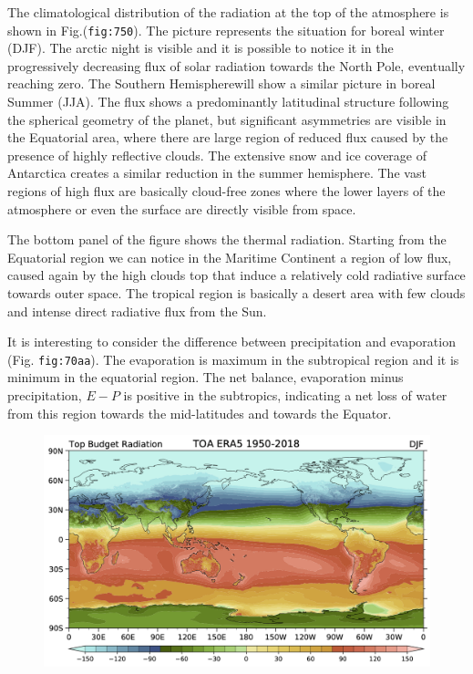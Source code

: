 
The climatological distribution of the radiation at the top of the
atmosphere is shown in Fig.(\texttt{fig:750}). The picture represents
the situation for boreal winter (DJF). The arctic night is visible and
it is possible to notice it in the progressively decreasing flux of
solar radiation towards the North Pole, eventually reaching zero. The
Southern Hemispherewill show a similar picture in boreal Summer (JJA).
The flux shows a predominantly latitudinal structure following the
spherical geometry of the planet, but significant asymmetries are
visible in the Equatorial area, where there are large region of reduced
flux caused by the presence of highly reflective clouds. The extensive
snow and ice coverage of Antarctica creates a similar reduction in the
summer hemisphere. The vast regions of high flux are basically
cloud-free zones where the lower layers of the atmosphere or even the
surface are directly visible from space.

The bottom panel of the figure shows the thermal radiation. Starting
from the Equatorial region we can notice in the Maritime Continent a
region of low flux, caused again by the high clouds top that induce a
relatively cold radiative surface towards outer space. The tropical
region is basically a desert area with few clouds and intense direct
radiative flux from the Sun.

It is interesting to consider the difference between precipitation and
evaporation (Fig. \texttt{fig:70aa}). The evaporation is maximum in the
subtropical region and it is minimum in the equatorial region. The net
balance, evaporation minus precipitation, \(E-P\) is positive in the
subtropics, indicating a net loss of water from this region towards the
mid-latitudes and towards the Equator.

\begin{figure}
\centering
\includegraphics[width = .7 \textwidth]{figs/GD/TOABudgetDJF.png}
\caption{} \label{fig:}
\end{figure}


